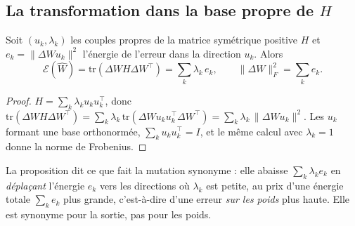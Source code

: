 \subsection{La transformation dans la base propre de \texorpdfstring{$H$}{H}}\label{t3sno:sec:spectre}

\begin{proposition}\label{t3sno:prop:propre}
Soit $(u_k, \lambda_k)$ les couples propres de la matrice symétrique positive $H$ et $e_k = \lVert \Delta W u_k \rVert^2$ l'énergie de l'erreur dans la direction $u_k$. Alors
\[
\mathcal{E}(\hat W) = \mathrm{tr}(\Delta W H \Delta W^\top) = \sum_k \lambda_k\, e_k,
\qquad
\lVert \Delta W \rVert_F^2 = \sum_k e_k .
\]
\end{proposition}
\begin{proof}
$H = \sum_k \lambda_k u_k u_k^\top$, donc $\mathrm{tr}(\Delta W H \Delta W^\top) = \sum_k \lambda_k\, \mathrm{tr}(\Delta W u_k u_k^\top \Delta W^\top) = \sum_k \lambda_k\, \lVert \Delta W u_k\rVert^2$. Les $u_k$ formant une base orthonormée, $\sum_k u_k u_k^\top = I$, et le même calcul avec $\lambda_k = 1$ donne la norme de Frobenius.
\end{proof}

\begin{lecture}
La proposition dit ce que fait la mutation synonyme : elle abaisse $\sum_k \lambda_k e_k$ en \emph{déplaçant} l'énergie $e_k$ vers les directions où $\lambda_k$ est petite, au prix d'une énergie totale $\sum_k e_k$ plus grande, c'est-à-dire d'une erreur \emph{sur les poids} plus haute. Elle est synonyme pour la sortie, pas pour les poids.
\end{lecture}

